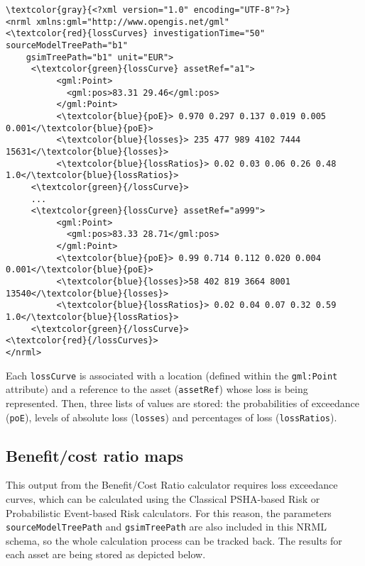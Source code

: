 \begin{Verbatim}[frame=single, commandchars=\\\{\}, samepage=false]
\textcolor{gray}{<?xml version="1.0" encoding="UTF-8"?>}
<nrml xmlns:gml="http://www.opengis.net/gml"
<\textcolor{red}{lossCurves} investigationTime="50" sourceModelTreePath="b1"
    gsimTreePath="b1" unit="EUR">
     <\textcolor{green}{lossCurve} assetRef="a1">
          <gml:Point>
            <gml:pos>83.31 29.46</gml:pos>
          </gml:Point>     
          <\textcolor{blue}{poE}> 0.970 0.297 0.137 0.019 0.005 0.001</\textcolor{blue}{poE}>
          <\textcolor{blue}{losses}> 235 477 989 4102 7444 15631</\textcolor{blue}{losses}>
          <\textcolor{blue}{lossRatios}> 0.02 0.03 0.06 0.26 0.48 1.0</\textcolor{blue}{lossRatios}>
     <\textcolor{green}{/lossCurve}>
     ...
     <\textcolor{green}{lossCurve} assetRef="a999">
          <gml:Point>
            <gml:pos>83.33 28.71</gml:pos>
          </gml:Point>     
          <\textcolor{blue}{poE}> 0.99 0.714 0.112 0.020 0.004 0.001</\textcolor{blue}{poE}>
          <\textcolor{blue}{losses}>58 402 819 3664 8001 13540</\textcolor{blue}{losses}>
          <\textcolor{blue}{lossRatios}> 0.02 0.04 0.07 0.32 0.59 1.0</\textcolor{blue}{lossRatios}>
     <\textcolor{green}{/lossCurve}>
<\textcolor{red}{/lossCurves}>      
</nrml>
\end{Verbatim}

Each \Verb+lossCurve+ is associated with a location (defined within the \Verb+gml:Point+ attribute) and a reference to the asset (\Verb+assetRef+) whose loss is being represented. Then, three lists of values are stored: the probabilities of exceedance (\Verb+poE+), levels of absolute loss (\Verb+losses+) and percentages of loss (\Verb+lossRatios+). 

\subsection{Benefit/cost ratio maps}
This output from the Benefit/Cost Ratio calculator requires loss exceedance curves, which can be calculated using the Classical PSHA-based Risk or Probabilistic Event-based Risk calculators. For this reason, the parameters \Verb+sourceModelTreePath+ and \Verb+gsimTreePath+ are also included in this NRML schema, so the whole calculation process can be tracked back. The results for each asset are being stored as depicted below.

